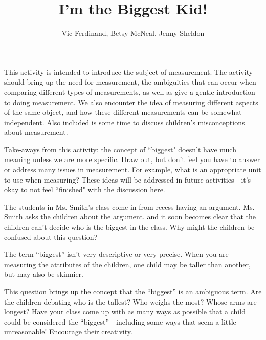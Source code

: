 \documentclass[]{ximera}
\title{I'm the Biggest Kid!}
\author{Vic Ferdinand, Betsy McNeal, Jenny Sheldon}
\begin{document}
\begin{abstract}\end{abstract}
\maketitle

\begin{instructorIntro}

This activity is intended to introduce the subject of measurement.  The activity should bring up the need for measurement, the ambiguities that can occur when comparing different types of measurements, as well as give a gentle introduction to doing measurement.  We also encounter the idea of measuring different aspects of the same object, and how these different measurements can be somewhat independent.  Also included is some time to discuss children's misconceptions about measurement.

Take-aways from this activity: the concept of ``biggest" doesn't have much meaning unless we are more specific.  Draw out, but don't feel you have to answer or address many issues in measurement.  For example, what is an appropriate unit to use when measuring?  These ideas will be addressed in future activities - it's okay to not feel ``finished" with the discussion here.


\end{instructorIntro}

\begin{problem}
    The students in Ms. Smith's class come in from recess having an argument.  Ms. Smith asks the children about the argument, and it soon becomes clear that the children can't decide who is the biggest in the class.  Why might the children be confused about this question?
    
    \begin{solution}
    The term ``biggest'' isn't very descriptive or very precise.  When you are measuring the attributes of the children, one child may be taller than another, but may also be skinnier.
    \end{solution}
    
    \begin{instructorNotes}
        This question brings up the concept that the ``biggest'' is an ambiguous term.  Are the children debating who is the tallest?  Who weighs the most?  Whose arms are longest?  Have your class come up with as many ways as possible that a child could be considered the ``biggest'' - including some ways that seem a little unreasonable!  Encourage their creativity.
    \end{instructorNotes}
\end{problem}
\end{document}
